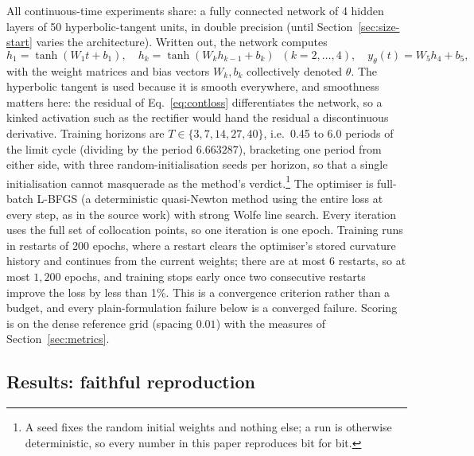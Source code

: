 \documentclass[11pt,a4paper]{article}
\begin{document}
All continuous-time experiments share: a fully connected network of 4
hidden layers of 50 hyperbolic-tangent units, in double precision (until
Section~\ref{sec:size-start} varies the architecture). Written out, the
network computes
\begin{equation*}
  h_1 = \tanh(W_1 t + b_1), \quad
  h_k = \tanh(W_k h_{k-1} + b_k) \;\; (k = 2, \dots, 4), \quad
  y_\theta(t) = W_5 h_4 + b_5 ,
\end{equation*}
with the weight matrices and bias vectors $W_k, b_k$ collectively
denoted $\theta$. The hyperbolic tangent is used because it is smooth
everywhere, and smoothness matters here: the residual of
Eq.~\eqref{eq:contloss} differentiates the network, so a kinked
activation such as the rectifier would hand the residual a discontinuous
derivative. Training horizons are
$T \in \{3, 7, 14, 27, 40\}$, i.e.\ 0.45 to 6.0 periods of the limit
cycle (dividing by the period $6.663287$), bracketing one period from
either side, with three
random-initialisation seeds per horizon, so that a single initialisation
cannot masquerade as the method's verdict.\footnote{A seed fixes the
random initial weights and nothing else; a run is otherwise deterministic,
so every number in this paper reproduces bit for bit.} The optimiser is
full-batch L-BFGS (a deterministic quasi-Newton method using the entire
loss at every step, as in the source work) with strong Wolfe line search.
Every iteration uses the full set of collocation points, so one iteration
is one epoch. Training runs in restarts of 200 epochs, where a restart
clears the optimiser's stored curvature history and continues from the
current weights; there are at most 6 restarts, so at most $1{,}200$
epochs, and training stops early once two consecutive restarts improve
the loss by less than 1\%. This is a convergence criterion rather than a
budget, and every plain-formulation failure below is a converged failure.
Scoring is on the dense reference grid (spacing $0.01$) with the measures
of Section~\ref{sec:metrics}.

\subsection{Results: faithful reproduction}
\label{sec:cont-results}
\end{document}
